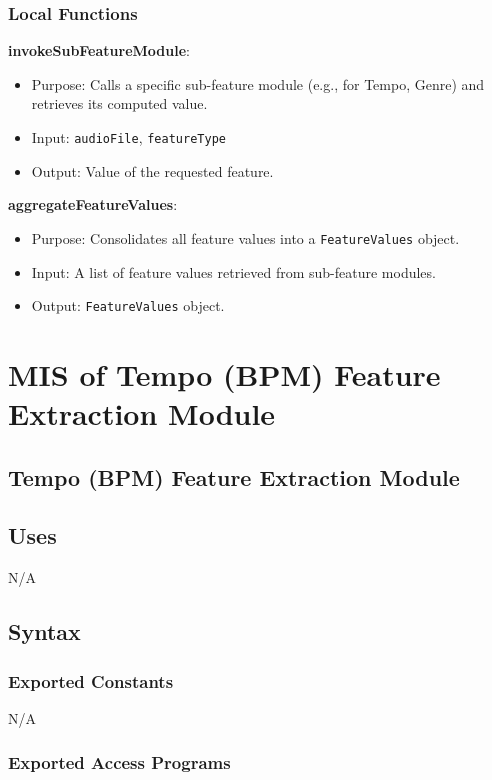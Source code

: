 \documentclass[12pt, titlepage]{article}
\begin{document}
\subsubsection{Local Functions}
\textbf{invokeSubFeatureModule}:
\begin{itemize}
    \item Purpose: Calls a specific sub-feature module (e.g., for Tempo, Genre) and retrieves its computed value.
    \item Input: \texttt{audioFile}, \texttt{featureType}
    \item Output: Value of the requested feature.
\end{itemize}

\textbf{aggregateFeatureValues}:
\begin{itemize}
    \item Purpose: Consolidates all feature values into a \texttt{FeatureValues} object.
    \item Input: A list of feature values retrieved from sub-feature modules.
    \item Output: \texttt{FeatureValues} object.
\end{itemize}

\section{MIS of Tempo (BPM) Feature Extraction Module} 

\subsection{Tempo (BPM) Feature Extraction Module}

\subsection{Uses}
N/A

\subsection{Syntax}

\subsubsection{Exported Constants}
N/A

\subsubsection{Exported Access Programs}
\end{document}
